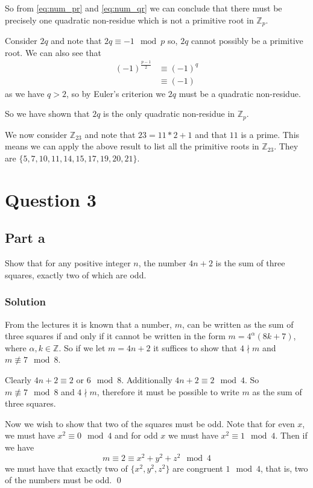 \documentclass{unswmaths}
\begin{document}
So from \eqref{eq:num_pr} and \eqref{eq:num_qr} we can conclude that there must 
be precisely one quadratic non-residue which is not a primitive root in $ \mathbb{Z}_p $.

Consider $ 2q $ and note that $ 2q \equiv -1 \mod p $ so, $ 2q $ cannot possibly be a 
primitive root.
We can also see that
\begin{align*}
	(-1)^{\frac{p-1}{2}} 	&\equiv (-1)^{q} \\
				&\equiv (-1)
\end{align*}
as we have $ q > 2 $, so by Euler's criterion we $ 2q $ must be a quadratic non-residue.

So we have shown that $ 2q $ is the only quadratic non-residue in $ \mathbb{Z}_{p} $.

We now consider $ \mathbb{Z}_{23} $ and note that $ 23 = 11 * 2 + 1 $ and that $ 11 $ is
a prime. This means we can apply the above result to list all the primitive roots in 
$ \mathbb{Z}_{23} $.
They are $ \{ 5,7,10,11,14,15,17,19,20,21\} $.
\section*{Question 3}
\subsection*{Part a}
Show that for any positive integer $ n $, the number $ 4n + 2 $ is the sum of three 
squares, exactly two of which are odd.


\subsubsection*{Solution}
From the lectures it is known that a number, $ m $, can be written as the sum of three
squares if and only if it cannot be written in the form $ m = 4^\alpha(8k + 7 ) $, 
where $ \alpha, k \in \mathbb{Z} $. So if we let $ m = 4n + 2 $ it suffices to show 
that $ 4 \nmid  m $ and $ m \not\equiv 7 \mod 8 $. 

Clearly $ 4n + 2 \equiv 2 \text{ or } 6 \mod 8 $. Additionally $ 4n + 2 \equiv 2 \mod 4 $.
So $ m \not\equiv 7 \mod 8 $ and $ 4 \nmid m $, therefore it must be possible to write $ m $ 
as the sum of three squares.

Now we wish to show that two of the squares must be odd. Note that for even $ x $,
we must have $ x^2 \equiv 0 \mod 4 $ and for odd $ x $ we must have 
$ x^2 \equiv 1 \mod 4 $. Then if we have $$ m \equiv 2 \equiv x^2 + y^2 + z^2 \mod 4 $$ we must
have that exactly two of $ \{ x^2, y^2, z^2 \} $ are congruent $ 1 \mod 4 $, that is, two of 
the numbers must be odd. 
\qed 
\end{document}
